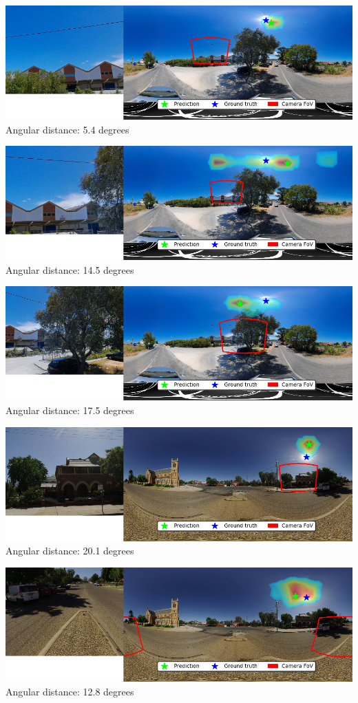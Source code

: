 \begin{multicols}{2}
\includegraphics[width=\mywidth]{pano_aaezuadrpeomdf.jpg}\\
Angular distance: 5.4 degrees

\includegraphics[width=\mywidth]{pano_aaezuadrpeomdf_002.jpg}\\
Angular distance: 14.5 degrees

\includegraphics[width=\mywidth]{pano_aaezuadrpeomdf_004.jpg}\\
Angular distance: 17.5 degrees

\includegraphics[width=\mywidth]{pano_aagpbpdmorbfwq_005.jpg}\\
Angular distance: 20.1 degrees

\includegraphics[width=\mywidth]{pano_aagpbpdmorbfwq_006.jpg}\\
Angular distance: 12.8 degrees


\end{multicols}
